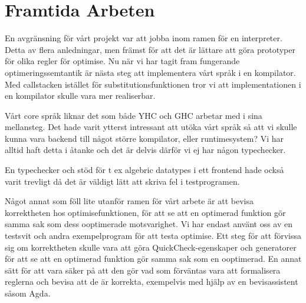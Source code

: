 \documentclass[Rapport]{subfiles}
\begin{document}
\section{Framtida Arbeten}

En avgränsning för vårt projekt var att jobba inom ramen för en interpreter. 
Detta av flera anledningar, men främst för att det är lättare att göra prototyper för 
olika regler för optimise. Nu när vi har tagit fram fungerande optimeringssemtantik 
är nästa steg att implementera vårt språk i en kompilator.
Med callstacken istället för substitutionsfunktionen tror vi att implementationen
i en kompilator skulle vara mer realiserbar.


Vårt core språk liknar det som både YHC och GHC arbetar med i sina mellansteg.
Det hade varit ytterst intressant att utöka vårt språk så att vi skulle kunna 
vara backend till något större kompilator, eller runtimesystem?
Vi har alltid haft detta i åtanke och det är delvis därför vi ej har någon 
typechecker.




En typechecker och stöd för t ex algebric datatypes i ett frontend hade också
varit trevligt då det är väldigt lätt att skriva fel i testprogramen. 


Något annat som föll lite utanför ramen för vårt arbete är att bevisa
korrektheten hos optimisefunktionen, för att se att en optimerad funktion
gör samma sak som dess ooptimerade motsvarighet. Vi har endast använt oss av en testsvit
och andra exempelprogram för att testa optimise. Ett steg för att förvissa sig
om korrektheten skulle vara att göra QuickCheck-egenskaper och generatorer för att se
att en optimerad funktion gör samma sak som en ooptimerad. En annat sätt för att vara säker på att den
gör vad som förväntas vara att formalisera reglerna och bevisa
att de är korrekta, exempelvis med hjälp av en bevisassistent såsom Agda.


\end{document}
